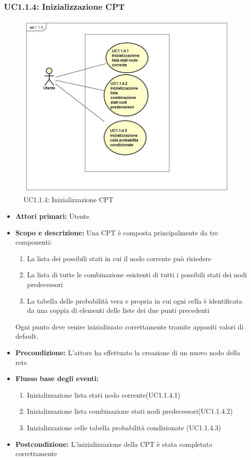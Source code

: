 \subsubsection{UC1.1.4: Inizializzazione CPT} 
\begin{figure} [H]
	\centering
	\includegraphics[scale=0.45]{Img/UC1-1-4} 
	\caption{UC1.1.4: Inizializzazione CPT} \label{} 
\end{figure} 
\begin{itemize} 
	\item{\textbf{Attori primari:} Utente} 
	\item{\textbf{Scopo e descrizione:} Una CPT è composta principalmente da tre componenti: 
		\begin{enumerate} 
			\item{La lista dei possibili stati in cui il nodo corrente può risiedere} 
			\item{La lista di tutte le combinazione esistenti di tutti i possibili stati dei nodi predecessori} 
			\item{La tabella delle probabilità vera e propria in cui ogni cella è identificata da una coppia di elementi delle liste dei due punti precedenti} 
		\end{enumerate} 			
		Ogni punto deve venire inizializzato correttamente tramite appositi valori di default.
	} 
	\item{\textbf{Precondizione:} L'attore ha effettuato la creazione di un nuovo nodo della rete} 
	\item{\textbf{Flusso base degli eventi:} } 
	\begin{enumerate} 
		\item{Inizializzazione lista stati nodo corrente(UC1.1.4.1)} 
		\item{Inizializzazione lista combinazione stati nodi predecessori(UC1.1.4.2)} 
		\item{Inizializzazione celle tabella probabilità condizionate (UC1.1.4.3)} 
	\end{enumerate} 
	\item{\textbf{Postcondizione:} L'inizializzazione della CPT è stata completata correttamente} 
\end{itemize} 
